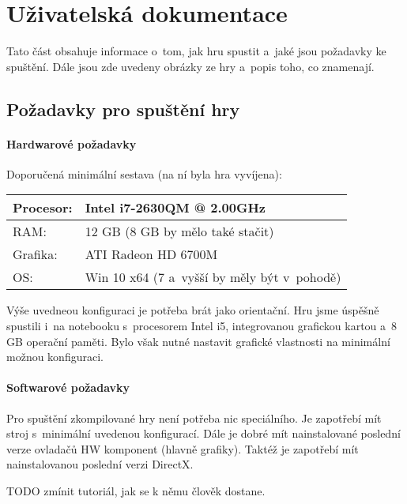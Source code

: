 
\chapter{Uživatelská dokumentace}

Tato část obsahuje informace o~tom, jak hru spustit a~jaké jsou požadavky ke spuštění. Dále jsou zde uvedeny obrázky ze hry a~popis toho, co znamenají. 

\section{Požadavky pro spuštění hry}
\subsubsection{Hardwarové požadavky}

Doporučená minimální sestava (na ní byla hra vyvíjena): 

\begin{center}
	\begin{tabular} { | l | l |}
		\hline
		Procesor: 	&	Intel i7-2630QM @ 2.00GHz \\	\hline
		RAM:		&	12 GB	(8 GB by mělo také stačit) \\	\hline
		Grafika:	&	ATI Radeon HD 6700M \\	\hline
		OS:			&	Win 10 x64	(7 a~vyšší by měly být v~pohodě) \\
		\hline
	\end{tabular}
\end{center}

Výše uvedneou konfiguraci je potřeba brát jako orientační. Hru jsme úspěšně spustili i~na notebooku s~procesorem Intel i5, integrovanou grafickou kartou a~8 GB operační paměti. Bylo však nutné nastavit grafické vlastnosti na minimální možnou konfiguraci. 

\subsubsection{Softwarové požadavky}

Pro spuštění zkompilované hry není potřeba nic speciálního. Je zapotřebí mít stroj s~minimální uvedenou konfigurací. Dále je dobré mít nainstalované poslední verze ovladačů HW komponent (hlavně grafiky).
Taktéž je zapotřebí mít nainstalovanou poslední verzi DirectX. 



TODO zmínit tutoriál, jak se k němu člověk dostane.












